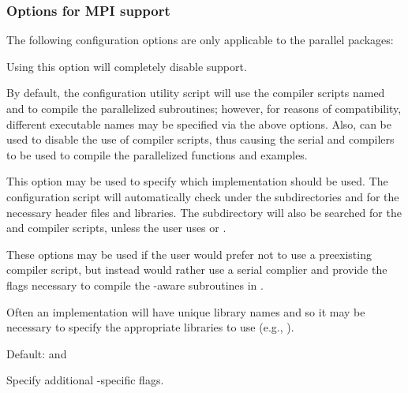 \subsubsection*{Options for MPI support}

\noindent The following configuration options are only applicable to the parallel
{\sundials} packages:

\begin{config}
  
\item {}

  Using this option will completely disable {\mpi} support.

\item {}
\item {}

  By default, the configuration utility script will use the {\mpi} compiler
  scripts named  and  to compile the parallelized
  {\sundials} subroutines; however, for reasons of compatibility, different
  executable names may be specified via the above options. Also, 
  can be used to disable the use of {\mpi} compiler scripts, thus causing
  the serial {\C} and {\F} compilers to be used to compile the parallelized
  {\sundials} functions and examples.

\item {}

  This option may be used to specify which {\mpi} implementation should be used.
  The {\sundials} configuration script will automatically check under the
  subdirectories  and  for the necessary
  header files and libraries. The subdirectory  will also be
  searched for the {\C} and {\F} {\mpi} compiler scripts, unless the user uses
   or .

\item {}
\item {}
\item {}

  These options may be used if the user would prefer not to use a preexisting
  {\mpi} compiler script, but instead would rather use a serial complier and
  provide the flags necessary to compile the {\mpi}-aware subroutines in
  {\sundials}.

  Often an {\mpi} implementation will have unique library names and so it may
  be necessary to specify the appropriate libraries to use (e.g.,
  ).

  Default:  and 

\item {}

  Specify additional {\mpi}-specific flags.

\end{config}


